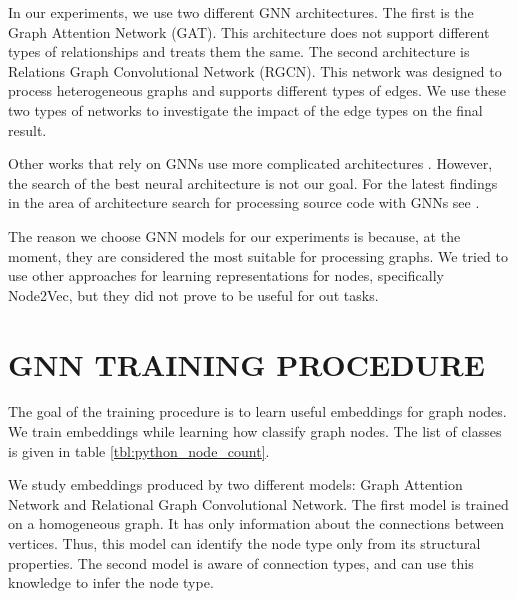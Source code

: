 \documentclass[a4paper,twoside]{article}
\begin{document}
In our experiments, we use two different GNN architectures. The first is the Graph Attention Network (GAT). This architecture does not support different types of relationships and treats them the same. The second architecture is Relations Graph Convolutional Network (RGCN). This network was designed to process heterogeneous graphs and supports different types of edges. We use these two types of networks to investigate the impact of the edge types on the final result. 

Other works that rely on GNNs use more complicated architectures \cite{Allamanis2017} \cite{Cvitkovic2018}. However, the search of the best neural architecture is not our goal. For the latest findings in the area of architecture search for processing source code with GNNs see \cite{hellendoorn2020global}.

The reason we choose GNN models for our experiments is because, at the moment, they are considered the most suitable for processing graphs. 
We tried to use other approaches for learning representations for nodes, specifically Node2Vec, but they did not prove to be useful for out tasks.





\section{\uppercase{GNN Training Procedure}}

The goal of the training procedure is to learn useful embeddings for graph nodes. We train embeddings while learning how classify graph nodes. The list of classes is given in table \ref{tbl:python_node_count}.

We study embeddings produced by two different models: Graph Attention Network and Relational Graph Convolutional Network. The first model is trained on a homogeneous graph. It has only information about the connections between vertices. Thus, this model can identify the node type only from its structural properties. The second model is aware of connection types, and can use this knowledge to infer the node type.
\end{document}
